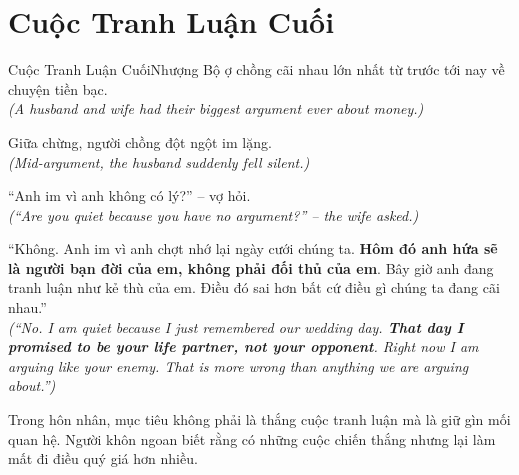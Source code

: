 \section{Cuộc Tranh Luận Cuối}
\begin{truyen}{Cuộc Tranh Luận Cuối}{Nhượng Bộ}
ợ chồng cãi nhau lớn nhất từ trước tới nay về chuyện tiền bạc.\\
\textit{(A husband and wife had their biggest argument ever about money.)}

Giữa chừng, người chồng đột ngột im lặng.\\
\textit{(Mid-argument, the husband suddenly fell silent.)}

``Anh im vì anh không có lý?'' – vợ hỏi.\\
\textit{(``Are you quiet because you have no argument?'' – the wife asked.)}

``Không. Anh im vì anh chợt nhớ lại ngày cưới chúng ta. \textbf{Hôm đó anh hứa sẽ là người bạn đời của em, không phải đối thủ của em}. Bây giờ anh đang tranh luận như kẻ thù của em. Điều đó sai hơn bất cứ điều gì chúng ta đang cãi nhau.''\\
\textit{(``No. I am quiet because I just remembered our wedding day. \textbf{That day I promised to be your life partner, not your opponent}. Right now I am arguing like your enemy. That is more wrong than anything we are arguing about.'')}
\end{truyen}
\begin{baihoc}
  Trong hôn nhân, mục tiêu không phải là thắng cuộc tranh luận mà là giữ gìn mối quan hệ. Người khôn ngoan biết rằng có những cuộc chiến thắng nhưng lại làm mất đi điều quý giá hơn nhiều.
\end{baihoc}

